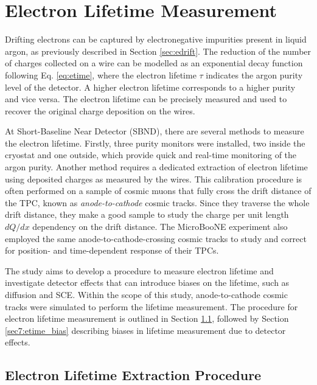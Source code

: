 \section{Electron Lifetime Measurement}
\label{sec7:etime}

Drifting electrons can be captured by electronegative impurities present in liquid argon, as previously described in Section \ref{sec:edrift}.
The reduction of the number of charges collected on a wire can be modelled as an exponential decay function following Eq. \ref{eq:etime}, where the electron lifetime $\tau$ indicates the argon purity level of the detector.
A higher electron lifetime corresponds to a higher purity and vice versa.
The electron lifetime can be precisely measured and used to recover the original charge deposition on the wires.

At Short-Baseline Near Detector (SBND), there are several methods to measure the electron lifetime.
Firstly, three purity monitors were installed, two inside the cryostat and one outside, which provide quick and real-time monitoring of the argon purity.
Another method requires a dedicated extraction of electron lifetime using deposited charges as measured by the wires.
This calibration procedure is often performed on a sample of cosmic muons that fully cross the drift distance of the TPC, known as \textit{anode-to-cathode} cosmic tracks.
Since they traverse the whole drift distance, they make a good sample to study the charge per unit length $dQ/dx$ dependency on the drift distance.
The MicroBooNE experiment also employed the same anode-to-cathode-crossing cosmic tracks to study and correct for position- and time-dependent response of their TPCs\cite{uboone_calib}.

The study aims to develop a procedure to measure electron lifetime and investigate detector effects that can introduce biases on the lifetime, such as diffusion and SCE.
Within the scope of this study, anode-to-cathode cosmic tracks were simulated to perform the lifetime measurement.
The procedure for electron lifetime measurement is outlined in Section \ref{sec7:etime_procedure}, followed by Section \ref{sec7:etime_bias} describing biases in lifetime measurement due to detector effects.


\subsection{Electron Lifetime Extraction Procedure}
\label{sec7:etime_procedure}

